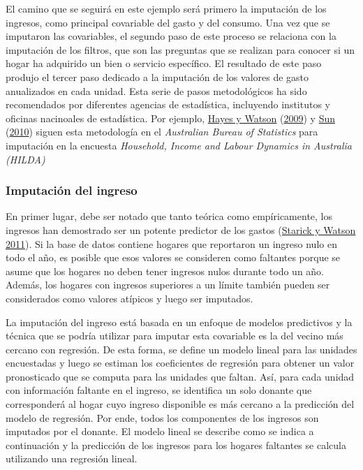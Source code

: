 \documentclass[
  12pt,
  spanish,
]{book}
\begin{document}
El camino que se seguirá en este ejemplo será primero la imputación de los ingresos, como principal covariable del gasto y del consumo. Una vez que se imputaron las covariables, el segundo paso de este proceso se relaciona con la imputación de los filtros, que son las preguntas que se realizan para conocer si un hogar ha adquirido un bien o servicio específico. El resultado de este paso produjo el tercer paso dedicado a la imputación de los valores de gasto anualizados en cada unidad. Esta serie de pasos metodológicos ha sido recomendados por diferentes agencias de estadística, incluyendo institutos y oficinas nacinoales de estadística. Por ejemplo, \protect\hyperlink{ref-Hayes_Watson_2009}{Hayes y Watson} (\protect\hyperlink{ref-Hayes_Watson_2009}{2009}) y \protect\hyperlink{ref-Sun_2010}{Sun} (\protect\hyperlink{ref-Sun_2010}{2010}) siguen esta metodología en el \emph{Australian Bureau of Statistics} para imputación en la encuesta \emph{Household, Income and Labour Dynamics in Australia (HILDA)}

\hypertarget{imputaciuxf3n-del-ingreso}{%
\subsubsection*{Imputación del ingreso}\label{imputaciuxf3n-del-ingreso}}

En primer lugar, debe ser notado que tanto teórica como empíricamente, los ingresos han demostrado ser un potente predictor de los gastos (\protect\hyperlink{ref-Starick_Watson_2011}{Starick y Watson 2011}). Si la base de datos contiene hogares que reportaron un ingreso nulo en todo el año, es posible que esos valores se consideren como faltantes porque se asume que los hogares no deben tener ingresos nulos durante todo un año. Además, los hogares con ingresos superiores a un límite también pueden ser considerados como valores atípicos y luego ser imputados.

La imputación del ingreso está basada en un enfoque de modelos predictivos y la técnica que se podría utilizar para imputar esta covariable es la del vecino más cercano con regresión. De esta forma, se define un modelo lineal para las unidades encuestadas y luego se estiman los coeficientes de regresión para obtener un valor pronosticado que se computa para las unidades que faltan. Así, para cada unidad con información faltante en el ingreso, se identifica un solo donante que corresponderá al hogar cuyo ingreso disponible es más cercano a la predicción del modelo de regresión. Por ende, todos los componentes de los ingresos son imputados por el donante. El modelo lineal se describe como se indica a continuación y la predicción de los ingresos para los hogares faltantes se calcula utilizando una regresión lineal.
\end{document}
